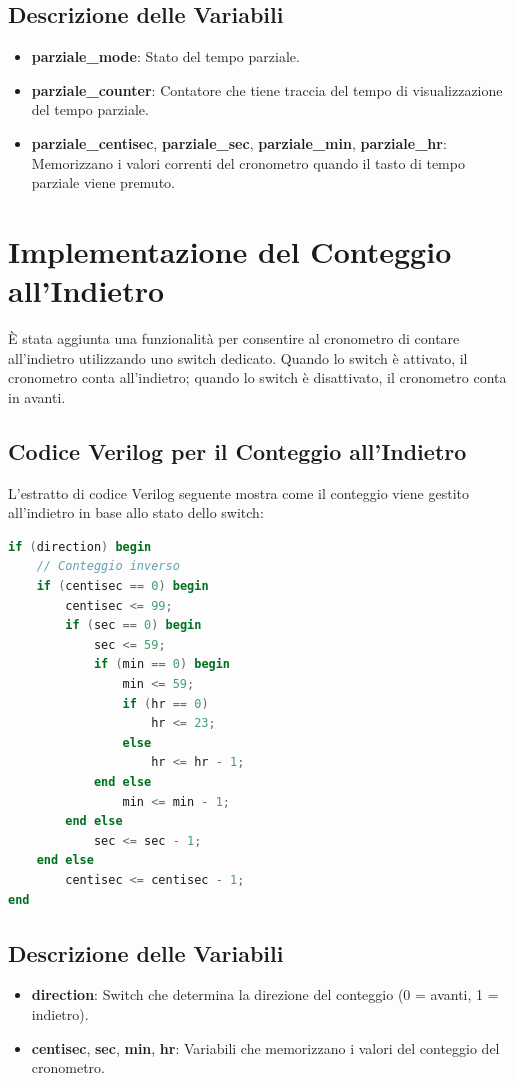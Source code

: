 \documentclass{article}
\begin{document}
\subsection{Descrizione delle Variabili}
\begin{itemize}
    \item \textbf{parziale\_mode}: Stato del tempo parziale.
    \item \textbf{parziale\_counter}: Contatore che tiene traccia del tempo di visualizzazione del tempo parziale.
    \item \textbf{parziale\_centisec}, \textbf{parziale\_sec}, \textbf{parziale\_min}, \textbf{parziale\_hr}: Memorizzano i valori correnti del cronometro quando il tasto di tempo parziale viene premuto.
\end{itemize}

\newpage

\section{Implementazione del Conteggio all'Indietro}
È stata aggiunta una funzionalità per consentire al cronometro di contare all'indietro utilizzando uno switch dedicato. 
Quando lo switch è attivato, il cronometro conta all'indietro; quando lo switch è disattivato, il cronometro conta in avanti.

\subsection{Codice Verilog per il Conteggio all'Indietro}
L'estratto di codice Verilog seguente mostra come il conteggio viene gestito all'indietro in base allo stato dello switch:

\begin{lstlisting}[language=Verilog, caption={Gestione del Conteggio all'Indietro}]
if (direction) begin
    // Conteggio inverso
    if (centisec == 0) begin
        centisec <= 99;
        if (sec == 0) begin
            sec <= 59;
            if (min == 0) begin
                min <= 59;
                if (hr == 0)
                    hr <= 23;
                else
                    hr <= hr - 1;
            end else
                min <= min - 1;
        end else
            sec <= sec - 1;
    end else
        centisec <= centisec - 1;
end
\end{lstlisting}

\subsection{Descrizione delle Variabili}
\begin{itemize}
    \item \textbf{direction}: Switch che determina la direzione del conteggio (0 = avanti, 1 = indietro).
    \item \textbf{centisec}, \textbf{sec}, \textbf{min}, \textbf{hr}: Variabili che memorizzano i valori del conteggio del cronometro.
\end{itemize}
\end{document}
